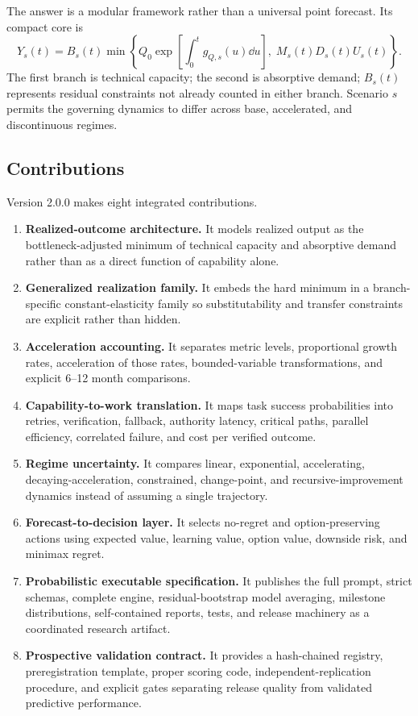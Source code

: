 The answer is a modular framework rather than a universal point forecast. Its compact core is
\begin{equation}
\label{eq:canonical-intro}
Y_s(t)=B_s(t)\min\left\{Q_0\exp\left[\int_0^t g_{Q,s}(u)\dd u\right],\;M_s(t)D_s(t)U_s(t)\right\}.
\end{equation}
The first branch is technical capacity; the second is absorptive demand; $B_s(t)$ represents residual constraints not already counted in either branch. Scenario $s$ permits the governing dynamics to differ across base, accelerated, and discontinuous regimes.

\subsection{Contributions}

Version 2.0.0 makes eight integrated contributions.

\begin{enumerate}
\item \textbf{Realized-outcome architecture.} It models realized output as the bottleneck-adjusted minimum of technical capacity and absorptive demand rather than as a direct function of capability alone.
\item \textbf{Generalized realization family.} It embeds the hard minimum in a branch-specific constant-elasticity family so substitutability and transfer constraints are explicit rather than hidden.
\item \textbf{Acceleration accounting.} It separates metric levels, proportional growth rates, acceleration of those rates, bounded-variable transformations, and explicit 6--12 month comparisons.
\item \textbf{Capability-to-work translation.} It maps task success probabilities into retries, verification, fallback, authority latency, critical paths, parallel efficiency, correlated failure, and cost per verified outcome.
\item \textbf{Regime uncertainty.} It compares linear, exponential, accelerating, decaying-acceleration, constrained, change-point, and recursive-improvement dynamics instead of assuming a single trajectory.
\item \textbf{Forecast-to-decision layer.} It selects no-regret and option-preserving actions using expected value, learning value, option value, downside risk, and minimax regret.
\item \textbf{Probabilistic executable specification.} It publishes the full prompt, strict schemas, complete engine, residual-bootstrap model averaging, milestone distributions, self-contained reports, tests, and release machinery as a coordinated research artifact.
\item \textbf{Prospective validation contract.} It provides a hash-chained registry, preregistration template, proper scoring code, independent-replication procedure, and explicit gates separating release quality from validated predictive performance.
\end{enumerate}

